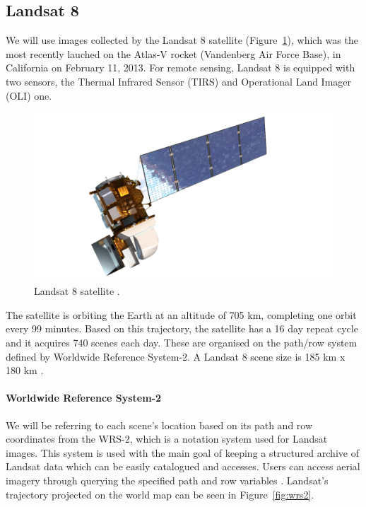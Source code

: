\documentclass[12pt, a4paper]{report}
\begin{document}
	\subsection{Landsat 8}
	\label{seq:landsat8_section}

	\par We will use images collected by the Landsat 8 satellite (Figure~\ref{fig:landsat_satellite}), which was the most recently lauched on the Atlas-V rocket (Vandenberg Air Force Base), in California on February 11, 2013. For remote sensing, Landsat 8 is equipped with two sensors, the Thermal Infrared Sensor (TIRS)  and Operational Land Imager (OLI) one.
	\begin{figure}[h!]
		\centering
		\includegraphics[scale=0.25]{../images/LandsatSatellite.png}
		\caption{Landsat 8 satellite \cite{LANDSATPIC}.}
		\label{fig:landsat_satellite}
	\end{figure}

	\par The satellite is orbiting the Earth at an altitude of 705 km, completing one orbit every 99 minutes. Based on this trajectory, the satellite has a 16 day repeat cycle and it acquires 740 scenes each day. These are organised on the path/row system defined by Worldwide Reference System-2. A Landsat 8 scene size is 185 km x 180 km \cite{LANDSAT}. 
	
	\paragraph{Worldwide Reference System-2}
	\label{par:wrs2}
	
	\par We will be referring to each scene's location based on its path and row coordinates from the WRS-2, which is a notation system used for Landsat images. This system is used with the main goal of keeping a structured archive of Landsat data which can be easily catalogued and accesses. Users can access aerial imagery through querying the specified path and row variables \cite{wrs}. Landsat's trajectory projected on the world map can be seen in Figure~\ref{fig:wrs2}.
\end{document}
